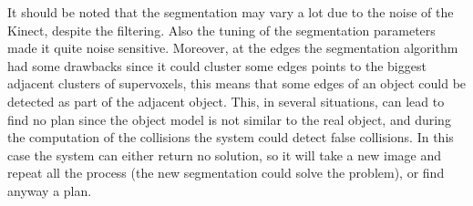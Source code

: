 It should be noted that the segmentation may vary a lot due to the noise of the Kinect, despite the filtering. Also the tuning of the segmentation parameters made it quite noise sensitive. Moreover, at the edges the segmentation algorithm had some drawbacks since it could cluster some edges points to the biggest adjacent clusters of supervoxels, this means that some edges of an object could be detected as part of the adjacent object. This, in several situations, can lead to find no plan since the object model is not similar to the real object, and during the computation of the collisions the system could detect false collisions. In this case the system can either return no solution, so it will take a new image and repeat all the process (the new segmentation could solve the problem), or find anyway a plan.  



